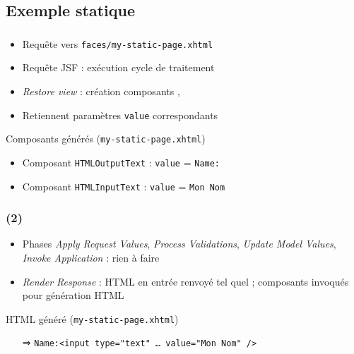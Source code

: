 \documentclass[english, french]{beamer}
\begin{document}
\subsection{Exemple statique}
\begin{frame}
	\frametitle{\subsecname}
	\begin{itemize}
		\item Requête vers \texttt{faces/my-static-page.xhtml}
		\item Requête JSF : exécution cycle de traitement
		\item \emph{Restore view} : création composants , 
		\item Retiennent paramètres \texttt{value} correspondants
	\end{itemize}
	\begin{exampleblock}{Composants générés (\texttt{my-static-page.xhtml})}
		\begin{itemize}
			\item Composant \texttt{HTMLOutputText} : \texttt{value} = \texttt{Name:}
			\item Composant \texttt{HTMLInputText} : \texttt{value} = \texttt{Mon Nom}
		\end{itemize}
	\end{exampleblock}
\end{frame}

\begin{frame}
	\frametitle{\subsecname{} (2)}
	\begin{itemize}
		\item Phases \emph{Apply Request Values}, \emph{Process Validations}, \emph{Update Model Values}, \emph{Invoke Application} : rien à faire
		\item \emph{Render Response} : HTML en entrée renvoyé tel quel ; composants invoqués pour génération HTML
	\end{itemize}
	\begin{exampleblock}{HTML généré (\texttt{my-static-page.xhtml})}
		\begin{itemize}
			\item[⇒] \texttt{Name:<input type="text" … value="Mon Nom" />}
		\end{itemize}
	\end{exampleblock}
\end{frame}
\end{document}

